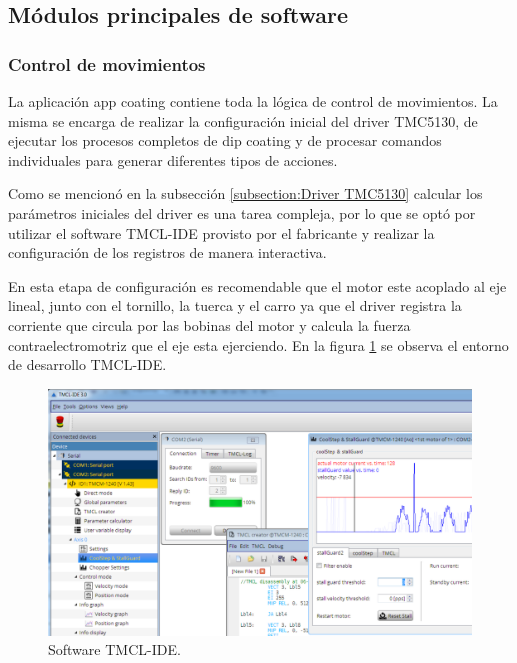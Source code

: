 \subsection{Módulos principales de software}
\label{sec:modulos principales}
\subsubsection{Control de movimientos}

La aplicación app coating contiene toda la lógica de control de movimientos. La misma se encarga de realizar la configuración inicial del driver TMC5130, de ejecutar los procesos completos de dip coating y de procesar comandos individuales para generar diferentes tipos de acciones. 

Como se mencionó en la subsección \ref{subsection:Driver TMC5130} calcular los parámetros iniciales del driver es una tarea compleja, por lo que se optó por utilizar el software TMCL-IDE provisto por el fabricante y realizar la configuración de los registros de manera interactiva.


En esta etapa de configuración es recomendable que el motor este acoplado al eje lineal, junto con el tornillo, la tuerca y el carro ya que el driver registra la corriente que circula por las bobinas del motor y calcula la fuerza contraelectromotriz que el eje esta ejerciendo. 
En la figura \ref{fig:tmcl_ide} se observa el entorno de desarrollo TMCL-IDE.  

\begin{figure}[h!t]
	\centering
	\includegraphics[width=1\textwidth]{./Figures/tmcl_ide_1.png}
	\caption{Software TMCL-IDE.}
	\label{fig:tmcl_ide}
\end{figure}


